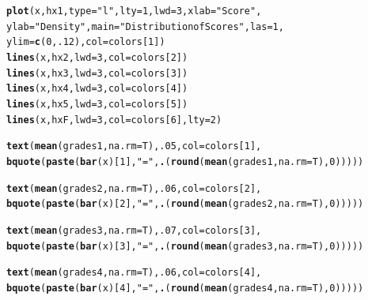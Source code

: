 \documentclass{article}\usepackage[]{graphicx}\usepackage[]{color}
\makeatletter
\newcommand{\hlnum}[1]{\textcolor[rgb]{0.686,0.059,0.569}{#1}}%
\newcommand{\hlstr}[1]{\textcolor[rgb]{0.192,0.494,0.8}{#1}}%
\newcommand{\hlstd}[1]{\textcolor[rgb]{0.345,0.345,0.345}{#1}}%
\newcommand{\hlkwc}[1]{\textcolor[rgb]{0.333,0.667,0.333}{#1}}%
\newcommand{\hlkwd}[1]{\textcolor[rgb]{0.737,0.353,0.396}{\textbf{#1}}}%
\newenvironment{kframe}{%
 \def\at@end@of@kframe{}%
 \ifinner\ifhmode%
  \def\at@end@of@kframe{\end{minipage}}%
  \begin{minipage}{\columnwidth}%
 \fi\fi%
 \def\FrameCommand##1{\hskip\@totalleftmargin \hskip-\fboxsep
 \colorbox{shadecolor}{##1}\hskip-\fboxsep
     \hskip-\linewidth \hskip-\@totalleftmargin \hskip\columnwidth}%
 \MakeFramed {\advance\hsize-\width
   \@totalleftmargin\z@ \linewidth\hsize
   \@setminipage}}%
 {\par\unskip\endMakeFramed%
 \at@end@of@kframe}
\newenvironment{knitrout}{}{} %
\makeatother
\begin{document}
\begin{knitrout}
\begin{kframe}
\begin{alltt}
\hlkwd{plot}\hlstd{(x, hx1,} \hlkwc{type}\hlstd{=}\hlstr{"l"}\hlstd{,} \hlkwc{lty}\hlstd{=}\hlnum{1}\hlstd{,} \hlkwc{lwd}\hlstd{=}\hlnum{3}\hlstd{,} \hlkwc{xlab}\hlstd{=}\hlstr{"Score"}\hlstd{,}
  \hlkwc{ylab}\hlstd{=}\hlstr{"Density"}\hlstd{,} \hlkwc{main}\hlstd{=}\hlstr{"Distribution of Scores"}\hlstd{,} \hlkwc{las}\hlstd{=}\hlnum{1}\hlstd{,}
  \hlkwc{ylim}\hlstd{=}\hlkwd{c}\hlstd{(}\hlnum{0}\hlstd{,}\hlnum{.12}\hlstd{),} \hlkwc{col}\hlstd{=colors[}\hlnum{1}\hlstd{])}
  \hlkwd{lines}\hlstd{(x, hx2,} \hlkwc{lwd}\hlstd{=}\hlnum{3}\hlstd{,} \hlkwc{col}\hlstd{=colors[}\hlnum{2}\hlstd{])}
  \hlkwd{lines}\hlstd{(x, hx3,} \hlkwc{lwd}\hlstd{=}\hlnum{3}\hlstd{,} \hlkwc{col}\hlstd{=colors[}\hlnum{3}\hlstd{])}
  \hlkwd{lines}\hlstd{(x, hx4,} \hlkwc{lwd}\hlstd{=}\hlnum{3}\hlstd{,} \hlkwc{col}\hlstd{=colors[}\hlnum{4}\hlstd{])}
  \hlkwd{lines}\hlstd{(x, hx5,} \hlkwc{lwd}\hlstd{=}\hlnum{3}\hlstd{,} \hlkwc{col}\hlstd{=colors[}\hlnum{5}\hlstd{])}
  \hlkwd{lines}\hlstd{(x, hxF,} \hlkwc{lwd}\hlstd{=}\hlnum{3}\hlstd{,} \hlkwc{col}\hlstd{=colors[}\hlnum{6}\hlstd{],} \hlkwc{lty}\hlstd{=}\hlnum{2}\hlstd{)}

\hlkwd{text}\hlstd{(}\hlkwd{mean}\hlstd{(grades1,} \hlkwc{na.rm}\hlstd{=T),} \hlnum{.05}\hlstd{,} \hlkwc{col}\hlstd{=colors[}\hlnum{1}\hlstd{],}
     \hlkwd{bquote}\hlstd{(}\hlkwd{paste}\hlstd{(}\hlkwd{bar}\hlstd{(x)[}\hlnum{1}\hlstd{],} \hlstr{" = "}\hlstd{,} \hlkwd{.}\hlstd{(}\hlkwd{round}\hlstd{(}\hlkwd{mean}\hlstd{(grades1,} \hlkwc{na.rm}\hlstd{=T),} \hlnum{0}\hlstd{)))))}

\hlkwd{text}\hlstd{(}\hlkwd{mean}\hlstd{(grades2,} \hlkwc{na.rm}\hlstd{=T),} \hlnum{.06}\hlstd{,} \hlkwc{col}\hlstd{=colors[}\hlnum{2}\hlstd{],}
     \hlkwd{bquote}\hlstd{(}\hlkwd{paste}\hlstd{(}\hlkwd{bar}\hlstd{(x)[}\hlnum{2}\hlstd{],} \hlstr{" = "}\hlstd{,} \hlkwd{.}\hlstd{(}\hlkwd{round}\hlstd{(}\hlkwd{mean}\hlstd{(grades2,} \hlkwc{na.rm}\hlstd{=T),} \hlnum{0}\hlstd{)))))}

\hlkwd{text}\hlstd{(}\hlkwd{mean}\hlstd{(grades3,} \hlkwc{na.rm}\hlstd{=T),} \hlnum{.07}\hlstd{,} \hlkwc{col}\hlstd{=colors[}\hlnum{3}\hlstd{],}
     \hlkwd{bquote}\hlstd{(}\hlkwd{paste}\hlstd{(}\hlkwd{bar}\hlstd{(x)[}\hlnum{3}\hlstd{],} \hlstr{" = "}\hlstd{,} \hlkwd{.}\hlstd{(}\hlkwd{round}\hlstd{(}\hlkwd{mean}\hlstd{(grades3,} \hlkwc{na.rm}\hlstd{=T),} \hlnum{0}\hlstd{)))))}

\hlkwd{text}\hlstd{(}\hlkwd{mean}\hlstd{(grades4,} \hlkwc{na.rm}\hlstd{=T),} \hlnum{.06}\hlstd{,} \hlkwc{col}\hlstd{=colors[}\hlnum{4}\hlstd{],}
     \hlkwd{bquote}\hlstd{(}\hlkwd{paste}\hlstd{(}\hlkwd{bar}\hlstd{(x)[}\hlnum{4}\hlstd{],} \hlstr{" = "}\hlstd{,} \hlkwd{.}\hlstd{(}\hlkwd{round}\hlstd{(}\hlkwd{mean}\hlstd{(grades4,} \hlkwc{na.rm}\hlstd{=T),} \hlnum{0}\hlstd{)))))}


\end{alltt}
\end{kframe}
\end{knitrout}
\end{document}
